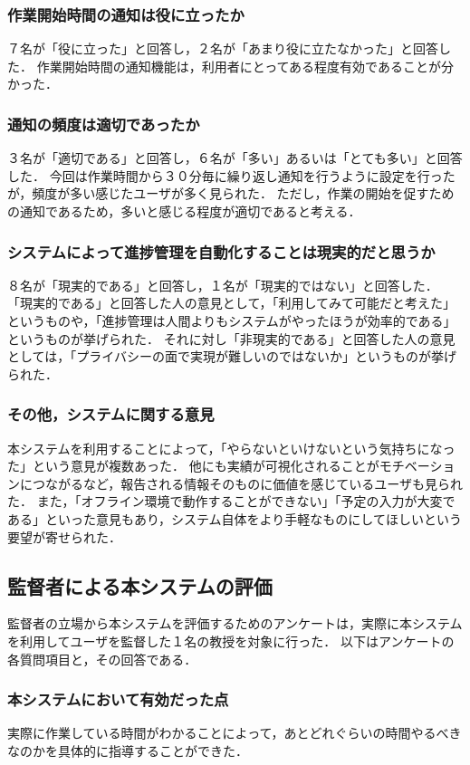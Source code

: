 \subsubsection{作業開始時間の通知は役に立ったか}
７名が「役に立った」と回答し，２名が「あまり役に立たなかった」と回答した．
作業開始時間の通知機能は，利用者にとってある程度有効であることが分かった．

\subsubsection{通知の頻度は適切であったか}
３名が「適切である」と回答し，６名が「多い」あるいは「とても多い」と回答した．
今回は作業時間から３０分毎に繰り返し通知を行うように設定を行ったが，頻度が多い感じたユーザが多く見られた．
ただし，作業の開始を促すための通知であるため，多いと感じる程度が適切であると考える．

\subsubsection{システムによって進捗管理を自動化することは現実的だと思うか}
８名が「現実的である」と回答し，１名が「現実的ではない」と回答した．
「現実的である」と回答した人の意見として，「利用してみて可能だと考えた」というものや，「進捗管理は人間よりもシステムがやったほうが効率的である」というものが挙げられた．
それに対し「非現実的である」と回答した人の意見としては，「プライバシーの面で実現が難しいのではないか」というものが挙げられた．

\subsubsection{その他，システムに関する意見}
本システムを利用することによって，「やらないといけないという気持ちになった」という意見が複数あった．
他にも実績が可視化されることがモチベーションにつながるなど，報告される情報そのものに価値を感じているユーザも見られた．
また，「オフライン環境で動作することができない」「予定の入力が大変である」といった意見もあり，システム自体をより手軽なものにしてほしいという要望が寄せられた．

\subsection{監督者による本システムの評価}
監督者の立場から本システムを評価するためのアンケートは，実際に本システムを利用してユーザを監督した１名の教授を対象に行った．
以下はアンケートの各質問項目と，その回答である．

\subsubsection{本システムにおいて有効だった点}
実際に作業している時間がわかることによって，あとどれぐらいの時間やるべきなのかを具体的に指導することができた．

